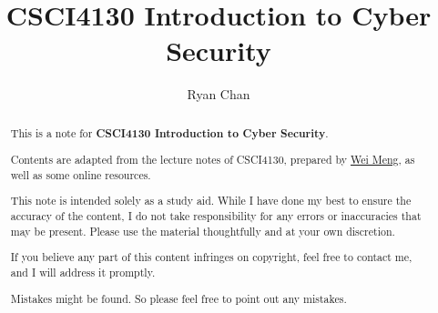 \documentclass[a4paper]{report}
\author{Ryan Chan}
\title{CSCI4130 Introduction to Cyber Security}
\begin{document}
\setlength\parindent{0pt}

\maketitle

\newpage

\begin{abstract}
	This is a note for \textbf{CSCI4130 Introduction to Cyber Security}. 
	
	Contents are adapted from the lecture notes of CSCI4130, prepared by \href{https://www.cse.cuhk.edu.hk/~wei/}{Wei Meng}, as well as some online resources.
	
	This note is intended solely as a study aid. While I have done my best to ensure the accuracy of the content, I do not take responsibility for any errors or inaccuracies that may be present. Please use the material thoughtfully and at your own discretion.
	
	If you believe any part of this content infringes on copyright, feel free to contact me, and I will address it promptly.
	
	Mistakes might be found. So please feel free to point out any mistakes.
\end{abstract}

\newpage

\tableofcontents

\setlength{\parskip}{5pt}
\end{document}
